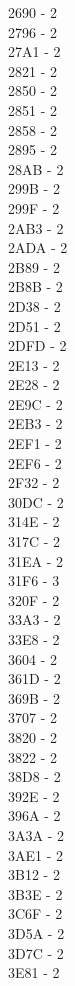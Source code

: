 \documentclass[10pt,letterpaper]{article}
\begin{document}
2690 -  2\\
2796 -  2\\
27A1 -  2\\
2821 -  2\\
2850 -  2\\
2851 -  2\\
2858 -  2\\
2895 -  2\\
28AB -  2\\
299B -  2\\
299F -  2\\
2AB3 -  2\\
2ADA -  2\\
2B89 -  2\\
2B8B -  2\\
2D38 -  2\\
2D51 -  2\\
2DFD -  2\\
2E13 -  2\\
2E28 -  2\\
2E9C -  2\\
2EB3 -  2\\
2EF1 -  2\\
2EF6 -  2\\
2F32 -  2\\
30DC -  2\\
314E -  2\\
317C -  2\\
31EA -  2\\
31F6 -  3\\
320F -  2\\
33A3 -  2\\
33E8 -  2\\
3604 -  2\\
361D -  2\\
369B -  2\\
3707 -  2\\
3820 -  2\\
3822 -  2\\
38D8 -  2\\
392E -  2\\
396A -  2\\
3A3A -  2\\
3AE1 -  2\\
3B12 -  2\\
3B3E -  2\\
3C6F -  2\\
3D5A -  2\\
3D7C -  2\\
3E81 -  2\\
\end{document}

